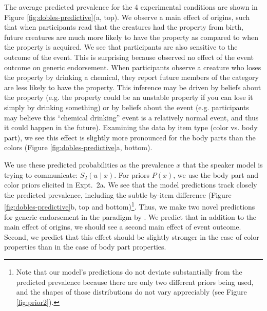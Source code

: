 \documentclass[12pt,letterpaper]{article}
\begin{document}
The average predicted prevalence for the 4 experimental conditions are shown in Figure \ref{fig:dobles-predictive}(a, top).
We observe a main effect of origins, such that when participants read that the creatures had the property from birth, future creatures  are much more likely to have the property as compared to when the property is acquired.
We see that participants are also sensitive to the outcome of the event.
This is surprising because  observed no effect of the event outcome on generic endorsement.
When participants observe a creature who loses the property by drinking a chemical, they report future members of the category are less likely to have the property.
This inference may be driven by beliefs about the property (e.g. the property could be an unstable property if you can lose it simply by drinking something) or by beliefs about the event (e.g. participants may believe this ``chemical drinking'' event is a relatively normal event, and thus it could happen in the future).
Examining the data by item type (color vs. body part), we see this effect is slightly more pronounced for the body parts than the colors (Figure \ref{fig:dobles-predictive}a, bottom). 

We use these predicted probabilities as the prevalence $x$ that the speaker model is trying to communicate: $S_2(u\mid x)$.
For priors $P(x)$, we use the body part and color priors elicited in Expt.~2a.
We see that the model predictions track closely the predicted prevalence, including the subtle by-item difference (Figure \ref{fig:dobles-predictive}b, top and bottom)\footnote{Note that our model's predictions do not deviate substantially from the predicted prevalence because there are only two different priors being used, and the shapes of those distributions do not vary appreciably (see Figure \ref{fig:prior2}).
}.
Thus, we make two novel predictions for generic endorsement in the paradigm by .
We predict that in addition to the main effect of origins, we should see a second main effect of event outcome.
Second, we predict that this effect should be slightly stronger in the case of color properties than in the case of body part properties.
\end{document}
